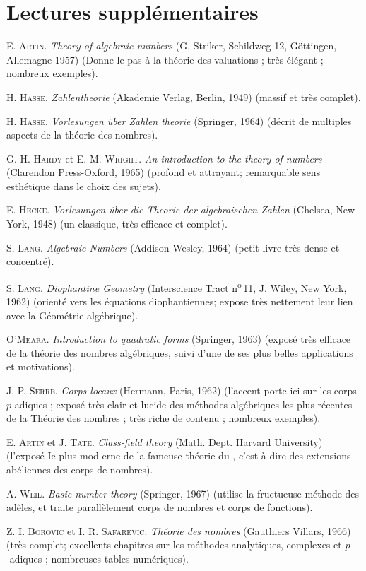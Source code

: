 \documentclass[11pt, useosf,
  title in boldface,
  theorem in new line,
  theorem numbering = section,
  number theorems separately,
]{simplivre}
\begin{document}
\chapter{Lectures supplémentaires}

\begin{hangparas}{1.2em}{1}
    \textsc{E. Artin}. \textit{Theory of algebraic numbers} (G. Striker, Schildweg 12, Göttingen, Allemagne-1957) (Donne le pas à la théorie des valuations ; très élégant ; nombreux exemples).

    \medskip
    \textsc{H. Hasse}. \textit{Zahlentheorie} (Akademie Verlag, Berlin, 1949) (massif et très complet).

    \medskip
    \textsc{H. Hasse}. \textit{Vorlesungen über Zahlen theorie} (Springer, 1964) (décrit de multiples aspects de la théorie des nombres).

    \medskip
    \textsc{G. H. Hardy} et \textsc{E. M. Wright}. \textit{An introduction to the theory of numbers} (Clarendon Press-Oxford, 1965) (profond et attrayant; remarquable sens esthétique dans le choix des sujets).

    \medskip
    \textsc{E. Hecke}. \textit{Vorlesungen über die Theorie der algebraischen Zahlen} (Chelsea, New York, 1948) (un classique, très efficace et complet).

    \medskip
    \textsc{S. Lang}. \textit{Algebraic Numbers} (Addison-Wesley, 1964) (petit livre très dense et concentré).

    \medskip
    \textsc{S. Lang}. \textit{Diophantine Geometry} (Interscience Tract n\textsuperscript{o}\,11, J. Wiley, New York, 1962) (orienté vers les équations diophantiennes; expose très nettement leur lien avec la Géométrie algébrique).

    \medskip
    \textsc{O'Meara}. \textit{Introduction to quadratic forms} (Springer, 1963) (exposé très efficace de la théorie des nombres algébriques, suivi d'une de ses plus belles applications et motivations).

    \medskip
    \textsc{J. P. Serre}. \textit{Corps locaux} (Hermann, Paris, 1962) (l'accent porte ici sur les corps \( p \)‑adiques ; exposé très clair et lucide des méthodes algébriques les plus récentes de la Théorie des nombres ; très riche de contenu ; nombreux exemples).

    \medskip
    \textsc{E. Artin} et \textsc{J. Tate}. \textit{Class-field theory} (Math. Dept. Harvard University) (l'exposé Ie plus mod erne de la fameuse théorie du , c'est-à-dire des extensions abéliennes des corps de nombres).

\pagebreak
    \medskip
    \textsc{A. Weil}. \textit{Basic number theory} (Springer, 1967) (utilise la fructueuse méthode des adèles, et traite parallèlement corps de nombres et corps de fonctions).

    \medskip
    \textsc{Z. I. Borovic} et \textsc{I. R. Safarevic}. \textit{Théorie des nombres} (Gauthiers Villars, 1966) (très complet; excellents chapitres sur les méthodes analytiques, complexes et \( p \)‑adiques ; nombreuses tables numériques).
\end{hangparas}


\printindex
\end{document}
